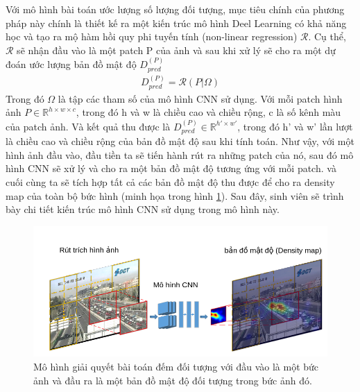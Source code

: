	Với mô hình bài toán ước lượng số lượng đối tượng, mục tiêu chính của phương pháp này chính là thiết kế ra một kiến trúc mô hình Deel Learning có khả năng học và tạo ra mộ hàm hồi quy phi tuyến tính (non-linear regression) $\mathcal{R}$. Cụ thể, $\mathcal{R}$ sẽ nhận đầu vào là một patch P của ảnh và sau khi xử lý sẽ cho ra một dự đoán ước lượng bản đồ mật độ $D_{pred}^{(P)}$
\begin{align}
   D_{pred}^{(P)} = \mathcal{R}(P|\Omega)
\end{align}
	Trong đó $\Omega$ là tập các tham số của mô hình CNN sử dụng. Với mỗi patch hình ảnh $P \in \mathbb{R} ^ { h \times w \times c}$, trong đó h và w là chiều cao và chiều rộng, c là số kênh màu của patch ảnh. Và kết quả thu được là $D_{pred}^{(P)} \in \mathbb{R} ^ { h' \times w'} $, trong đó h' và w' lần lượt là chiều cao và chiều rộng của bản đồ mật độ sau khi tính toán. Như vậy, với một hình ảnh đầu vào, đầu tiền ta sẽ tiến hành rút ra những patch của nó, sau đó mô hình CNN sẽ xử lý và cho ra một bản đồ mật độ tương ứng với mỗi patch. và cuối cùng ta sẽ tích hợp tất cả các bản đồ mật độ thu được để cho ra density map của toàn bộ bức hình (minh họa trong hình \ref{mohinh}). Sau đây, sinh viên sẽ trình bày chi tiết kiến trúc mô hình CNN sử dụng trong mô hình này.
	
\begin{figure}[ht]
  			\begin{center}
    				\includegraphics[scale=0.5]{mohinh} 
    				\caption{Mô hình giải quyết bài toán đếm đối tượng với đầu vào là một bức ảnh và đầu ra là một bản đồ mật độ đối tượng trong bức ảnh đó.} 
    				\label{mohinh}
  			\end{center}
\end{figure}	





